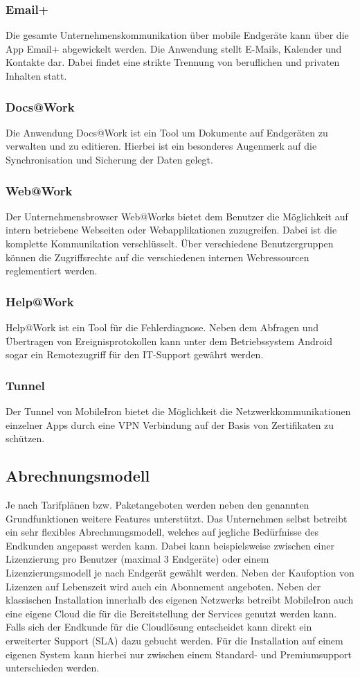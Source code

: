 \subsubsection {Email+}
Die gesamte Unternehmenskommunikation über mobile Endgeräte kann über die App Email+ abgewickelt werden. Die Anwendung stellt E-Mails, Kalender und Kontakte dar. Dabei findet eine strikte Trennung von beruflichen und privaten Inhalten statt. 
\subsubsection {Docs@Work}
Die Anwendung Docs@Work ist ein Tool um Dokumente auf Endgeräten zu verwalten und zu editieren. Hierbei ist ein besonderes Augenmerk auf die Synchronisation und Sicherung der Daten gelegt. 
\subsubsection {Web@Work}
Der Unternehmensbrowser Web@Works bietet dem Benutzer die Möglichkeit auf intern betriebene Webseiten oder Webapplikationen zuzugreifen.  Dabei ist die komplette Kommunikation verschlüsselt. Über verschiedene Benutzergruppen können die  Zugriffsrechte  auf die verschiedenen internen Webressourcen reglementiert werden. 
\subsubsection {Help@Work}
Help@Work ist ein Tool für die Fehlerdiagnose. Neben dem Abfragen und Übertragen von Ereignisprotokollen kann unter dem Betriebssystem Android sogar ein Remotezugriff für den IT-Support gewährt werden. 
\subsubsection {Tunnel}
Der Tunnel von MobileIron bietet die Möglichkeit die Netzwerkkommunikationen einzelner Apps durch eine VPN Verbindung auf der Basis von Zertifikaten zu schützen.

\subsection {Abrechnungsmodell}

Je nach Tarifplänen bzw. Paketangeboten werden neben den genannten Grundfunktionen weitere Features unterstützt. Das Unternehmen selbst betreibt ein sehr flexibles Abrechnungsmodell, welches auf jegliche Bedürfnisse des Endkunden angepasst werden kann. Dabei kann beispielsweise zwischen einer Lizenzierung pro Benutzer (maximal 3 Endgeräte) oder einem Lizenzierungsmodell je nach Endgerät gewählt werden. Neben der Kaufoption von Lizenzen auf Lebenszeit wird auch ein Abonnement angeboten. Neben der klassischen Installation innerhalb des eigenen Netzwerks betreibt MobileIron auch eine eigene Cloud die für die Bereitstellung der Services genutzt werden kann. Falls sich der Endkunde für die Cloudlösung entscheidet kann direkt ein erweiterter Support (SLA) dazu gebucht werden. Für die Installation auf einem eigenen System kann hierbei nur zwischen einem Standard- und Premiumsupport unterschieden werden.  

